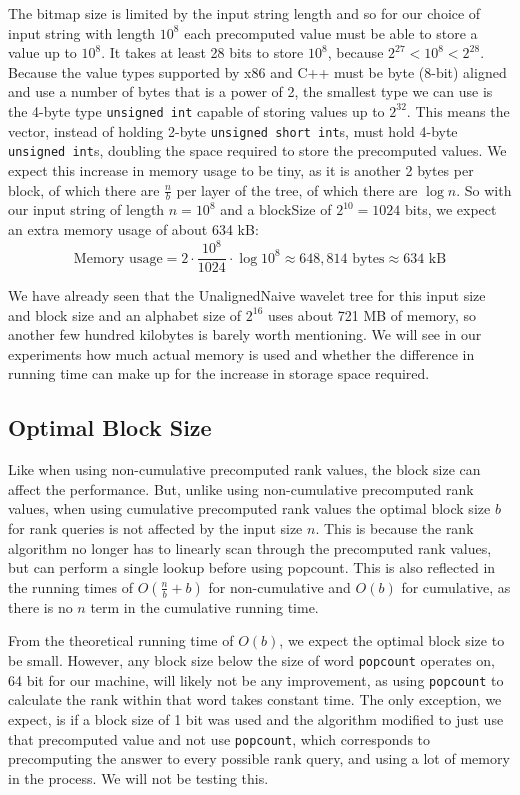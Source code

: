 The bitmap size is limited by the input string length and so for our choice of input string with length $10^8$ each precomputed value must be able to store a value up to $10^8$.
It takes at least 28 bits to store $10^8$, because $2^{27} < 10^8 < 2^{28}$.
Because the value types supported by x86 and C++ must be byte (8-bit) aligned and use a number of bytes that is a power of 2, the smallest type we can use is the 4-byte type \texttt{unsigned int} capable of storing values up to $2^{32}$.
This means the vector, instead of holding 2-byte \texttt{unsigned short int}s, must hold 4-byte \texttt{unsigned int}s, doubling the space required to store the precomputed values.
We expect this increase in memory usage to be tiny, as it is another 2 bytes per block, of which there are $\frac{n}{b}$ per layer of the tree, of which there are $\log n$.
So with our input string of length $n = 10^8$ and a blockSize of $2^{10} = 1024$ bits, we expect an extra memory usage of about 634 kB:
\[\text{Memory usage} = 2 \cdot \frac{10^8}{1024} \cdot \log 10^8 \approx 648,814 \text{ bytes} \approx 634 \text{ kB} \]

We have already seen that the UnalignedNaive wavelet tree for this input size and block size and an alphabet size of $2^{16}$ uses about 721 MB of memory, so another few hundred kilobytes is barely worth mentioning.
We will see in our experiments how much actual memory is used and whether the difference in running time can make up for the increase in storage space required.

\subsection{Optimal Block Size}
\label{sec:OptimalBlockSize}
Like when using non-cumulative precomputed rank values, the block size can affect the performance.
But, unlike using non-cumulative precomputed rank values, when using cumulative precomputed rank values the optimal block size $b$ for rank queries is not affected by the input size $n$.
This is because the rank algorithm no longer has to linearly scan through the precomputed rank values, but can perform a single lookup before using popcount.
This is also reflected in the running times of $O(\frac{n}{b} + b)$ for non-cumulative and $O(b)$ for cumulative, as there is no $n$ term in the cumulative running time.

From the theoretical running time of $O(b)$, we expect the optimal block size to be small.
However, any block size below the size of word \texttt{popcount} operates on, 64 bit for our machine, will likely not be any improvement, as using \texttt{popcount} to calculate the rank within that word takes constant time.
The only exception, we expect, is if a block size of 1 bit was used and the algorithm modified to just use that precomputed value and not use \texttt{popcount}, which corresponds to precomputing the answer to every possible rank query, and using a lot of memory in the process.
We will not be testing this.

